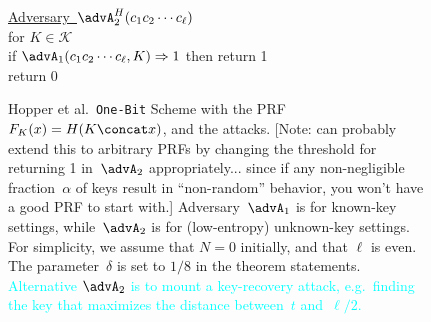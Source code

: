 \begin{figure}[tph]
\begin{center}
{\medskip
\underline{Adversary~$\advA_2^H(c_1 c_2 \cdots c_\ell)$}\\[2pt]
for $K \in \mathcal{K}$\\
\nudge if $\advA_1(c_1 c_2 \cdots c_\ell, K) \Rightarrow 1$ then return 1\\
return 0
}
\caption{Hopper et al.\ \texttt{One-Bit} Scheme with the PRF
  $F_K(x)=H(K \concat x)$, and the attacks.  [Note: can probably
  extend this to arbitrary PRFs by changing the threshold for
  returning 1 in~$\advA_2$
  appropriately... since if any non-negligible fraction~$\alpha$ of keys result
  in ``non-random'' behavior, you won't have a good PRF to start
  with.]  Adversary~$\advA_1$ is for known-key settings,
  while~$\advA_2$ is for (low-entropy) unknown-key settings.  For
  simplicity, we assume that $N=0$ initially, and that $\ell$ is
  even.  The parameter~$\delta$ is set to $1/8$ in the theorem
  statements. 
\textcolor{cyan}{Alternative $\advA_2$ is to mount a key-recovery attack, e.g.\ finding the key that maximizes the distance between~$t$ and~$\ell/2$.}}
\label{fig:one-bit}
\end{center}
\end{figure}

